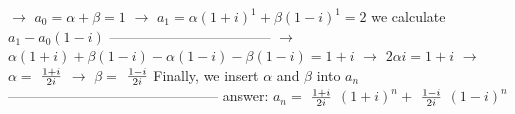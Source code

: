 \documentclass[a4 paper]{article}
\numberwithin{equation}{section}
\newcommand{\0}{\mathbf{0}}
\begin{document}
$\to$ $a_0 = \alpha+\beta = 1$ \newline \newline
$\to$ $a_1 = \alpha(1+i)^1+\beta(1-i)^1 = 2$ \newline \newline
we calculate $a_1-a_0(1-i)$ \newline
----------------------------------- \newline
$\to$ $\alpha(1+i)+\beta(1-i)-\alpha(1-i)-\beta(1-i) = 1+i$ \newline \newline
$\to$ $2\alpha i = 1+i$ \newline \newline
$\to$ $\alpha =$  $1+i\over2i$ \newline \newline
$\to$ $\beta =$  $1-i\over2i$ \newline \newline
Finally, we insert $\alpha$ and $\beta$ into $a_n$ \newline
--------------------------------------------- \newline
answer: $a_n =$ $1+i\over2i$ $(1+i)^n+$ $1-i\over2i$ $(1-i)^n$ \newline \newline
\end{document}
